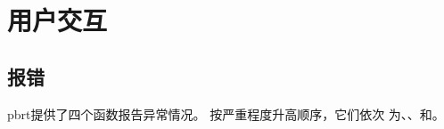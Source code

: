 \section{用户交互}\label{sec:用户交互}

\subsection{报错}\label{sub:报错}
pbrt提供了四个函数报告异常情况。
按严重程度升高顺序，它们依次
为{}、{}、{}和{}。